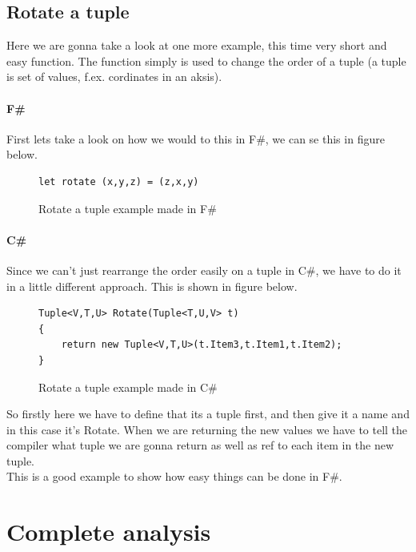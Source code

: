 \documentclass[12pt, a4paper]{article}
\begin{document}
\newpage
\subsection{Rotate a tuple}
Here we are gonna take a look at one more example, this time very short and easy function. The function simply is used to change the order of a tuple (a tuple is set of values, f.ex. cordinates in an aksis).\\
   
\paragraph{F\#}
First lets take a look on how we would to this in F\#, we can se this in figure below.

\begin{figure}[!h]
\begin{lstlisting}
let rotate (x,y,z) = (z,x,y)
\end{lstlisting}
\caption{Rotate a tuple example made in F\#}
\label{fig:RotateTupleFSharp}
\end{figure}

\paragraph{C\#}
Since we can’t just rearrange the order easily on a tuple in C\#, we have to do it in a little different approach. This is shown in figure below.\\

\begin{figure}[!h]
\begin{lstlisting}
Tuple<V,T,U> Rotate(Tuple<T,U,V> t) 
{ 
    return new Tuple<V,T,U>(t.Item3,t.Item1,t.Item2); 
}
\end{lstlisting}
\caption{Rotate a tuple example made in C\#}
\label{fig:RotateTupleCSharp}
\end{figure}

So firstly here we have to define that its a tuple first, and then give it a name and in this case it’s Rotate. When we are returning the new values we have to tell the compiler what tuple we are gonna return as well as ref to each item in the new tuple.\\

This is a good example to show how easy things can be done in F\#.

\newpage
\section{Complete analysis}
\end{document}
